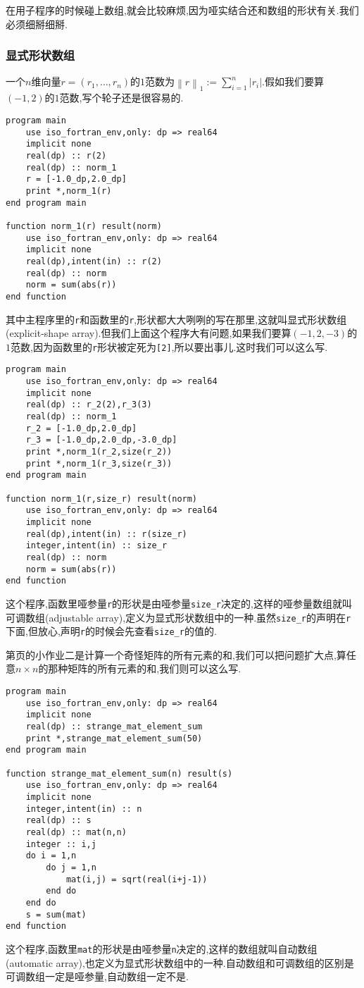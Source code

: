 在用子程序的时候碰上数组,就会比较麻烦,因为哑实结合还和数组的形状有关.我们必须细掰细掰.

\subsubsection{显式形状数组}
一个$n$维向量$r=(r_1,\dots,r_n)$的$1$范数为$\left\lVert r\right\rVert_1:=\sum_{i=1}^n\left\lvert r_i\right\rvert $.假如我们要算$(-1,2)$的$1$范数,写个轮子还是很容易的.
\begin{lstlisting}
program main
    use iso_fortran_env,only: dp => real64
    implicit none
    real(dp) :: r(2)
    real(dp) :: norm_1
    r = [-1.0_dp,2.0_dp]
    print *,norm_1(r)
end program main

function norm_1(r) result(norm)
    use iso_fortran_env,only: dp => real64
    implicit none
    real(dp),intent(in) :: r(2)
    real(dp) :: norm
    norm = sum(abs(r))
end function
\end{lstlisting}
其中主程序里的\texttt{r}和函数里的\texttt{r},形状都大大咧咧的写在那里,这就叫显式形状数组(explicit-shape array).但我们上面这个程序大有问题,如果我们要算$(-1,2,-3)$的$1$范数,因为函数里的\texttt{r}形状被定死为\texttt{[2]},所以要出事儿.这时我们可以这么写.\label{adjustable_array}
\begin{lstlisting}
program main
    use iso_fortran_env,only: dp => real64
    implicit none
    real(dp) :: r_2(2),r_3(3)
    real(dp) :: norm_1
    r_2 = [-1.0_dp,2.0_dp]
    r_3 = [-1.0_dp,2.0_dp,-3.0_dp]
    print *,norm_1(r_2,size(r_2))
    print *,norm_1(r_3,size(r_3))
end program main

function norm_1(r,size_r) result(norm)
    use iso_fortran_env,only: dp => real64
    implicit none
    real(dp),intent(in) :: r(size_r)
    integer,intent(in) :: size_r
    real(dp) :: norm
    norm = sum(abs(r))
end function
\end{lstlisting}
这个程序,函数里哑参量\texttt{r}的形状是由哑参量\texttt{size\_{}r}决定的,这样的哑参量数组就叫可调数组(adjustable array),定义为显式形状数组中的一种.虽然\texttt{size\_{}r}的声明在\texttt{r}下面,但放心,声明\texttt{r}的时候会先查看\texttt{size\_{}r}的值的.

第\pageref{hw_2}页的小作业二是计算一个奇怪矩阵的所有元素的和,我们可以把问题扩大点,算任意$n\times n$的那种矩阵的所有元素的和,我们则可以这么写.
\begin{lstlisting}
program main
    use iso_fortran_env,only: dp => real64
    implicit none
    real(dp) :: strange_mat_element_sum
    print *,strange_mat_element_sum(50)
end program main

function strange_mat_element_sum(n) result(s)
    use iso_fortran_env,only: dp => real64
    implicit none
    integer,intent(in) :: n
    real(dp) :: s
    real(dp) :: mat(n,n)
    integer :: i,j
    do i = 1,n
        do j = 1,n
            mat(i,j) = sqrt(real(i+j-1))
        end do
    end do
    s = sum(mat)
end function
\end{lstlisting}
这个程序,函数里\texttt{mat}的形状是由哑参量\texttt{n}决定的,这样的数组就叫自动数组(automatic array),也定义为显式形状数组中的一种.自动数组和可调数组的区别是可调数组一定是哑参量,自动数组一定不是.

